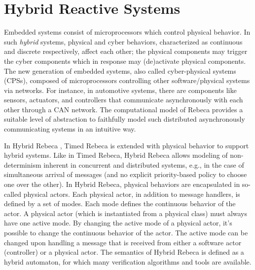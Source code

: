 \section{Hybrid Reactive Systems}\label{sec::HRebeca}
Embedded systems consist of microprocessors which control physical behavior. In such \emph{hybrid} systems, physical and cyber behaviors, characterized as continuous and discrete respectively, affect each other; the physical components may trigger the cyber components which 
in response may 
(de)activate physical components.
The new generation of embedded systems, also called cyber-physical systems (CPSs), composed of microprocessors controlling other software/physical systems via networks. For instance, in automotive systems, there are components like sensors, actuators, and controllers that communicate asynchronously with each other through a CAN network. The computational model of Rebeca provides a suitable level of abstraction to faithfully model such distributed asynchronously communicating systems in an intuitive way.

In Hybrid Rebeca \cite{HRebeca}, Timed Rebeca is extended with physical behavior to support hybrid systems.
Like in Timed Rebeca, Hybrid Rebeca  allows modeling of non-determinism inherent in concurrent and distributed systems, e.g., in the case of simultaneous arrival of messages (and no explicit priority-based policy to choose one over the other).
In Hybrid Rebeca, physical behaviors are encapsulated in so-called physical actors. %
%
%
Each physical actor, in addition to message handlers, is defined by a set of modes. Each mode defines the continuous behavior of the actor. A physical actor (which is instantiated from a physical class) must always have one active mode. By changing the active mode of a physical actor, it's possible to change the continuous behavior of the actor. The active mode can be changed upon handling a message that is received from either a software actor (controller) or a physical actor. The semantics of Hybrid Rebeca is defined as a hybrid automaton, for which many verification algorithms and tools are available. 

